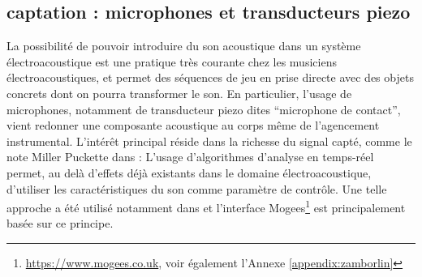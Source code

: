 \subsection{captation : microphones et transducteurs piezo}

\noindent La possibilité de pouvoir introduire du son acoustique dans un système électroacoustique est une pratique très courante chez les musiciens électroacoustiques, et permet des séquences de jeu en prise directe avec des objets concrets dont on pourra transformer le son. En particulier, l'usage de microphones, notamment de transducteur piezo dites ``microphone de contact'', vient redonner une composante acoustique au corps même de l'agencement instrumental. L'intérêt principal réside dans la richesse du signal capté, comme le note Miller Puckette dans \cite{puckette_infuriating_2011}:  L'usage d'algorithmes d'analyse en temps-réel permet, au delà d'effets déjà existants dans le domaine électroacoustique, d'utiliser les caractéristiques du son comme paramètre de contrôle. Une telle approche a été utilisé notamment dans \cite{schwarz_rich_2014} et l'interface Mogees\footnote{\url{https://www.mogees.co.uk}, voir également l'Annexe \ref{appendix:zamborlin}} est principalement basée sur ce principe. 



